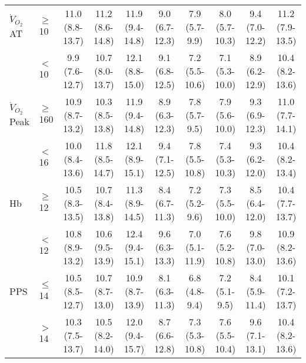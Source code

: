 \begin{sidewaystable}[p]
\begin{tabular}{|l l | cc cc cc cc |}
		$\dot{V}_{O_2}$AT   & $\geq$10  & 11.0 (8.8-13.7) & 11.2 (8.6-14.8) & 11.9 (9.4-14.8)  & 9.0 (6.7-12.3)  & 7.9 (5.7-9.9)  & 8.0 (5.7-10.3) & 9.4 (7.0-12.2)  & 11.2 (7.9-13.5) \\
		                    & $<$10     & 9.9 (7.6-12.7)  & 10.7 (8.0-13.7) & 12.1 (8.8-15.0)  & 9.1 (6.8-12.5)  & 7.2 (5.5-10.6) & 7.1 (5.3-10.0) & 8.9 (6.2-12.9)  & 10.4 (8.2-13.6) \\
		$\dot{V}_{O_2}$Peak & $\geq$160 & 10.9 (8.7-13.2) & 10.3 (8.5-13.8) & 11.9 (9.4-14.8)  & 8.9 (6.3-12.3)  & 7.8 (5.7-9.5)  & 7.9 (5.6-10.0) & 9.3 (6.9-12.3)  & 11.0 (7.7-14.1) \\
		                    & $<$16     & 10.0 (8.4-13.6) & 11.8 (8.5-14.7) & 12.1 (8.9-15.1)  & 9.4 (7.1-12.5)  & 7.8 (5.5-10.8) & 7.4 (5.3-10.3) & 9.3 (6.2-12.0)  & 10.4 (8.2-13.4) \\
		Hb                  & $\geq$12  & 10.5 (8.3-13.5) & 10.7 (8.4-13.8) & 11.3 (8.9-14.5)  & 8.4 (6.7-11.3)  & 7.2 (5.2-9.6)  & 7.3 (5.5-10.0) & 8.5 (6.4-12.0)  & 10.4 (7.7-13.7) \\
		                    & $<$12     & 10.8 (8.9-13.2) & 10.6 (9.5-13.9) & 12.4 (9.4-15.1)  & 9.6 (6.3-13.3)  & 7.0 (5.1-11.9) & 7.6 (5.2-10.8) & 9.8 (7.0-13.0)  & 10.9 (8.2-13.6) \\
		PPS                 & $\leq$14  & 10.5 (8.5-12.7) & 10.7 (8.7-13.0) & 10.9 (8.7-13.9)  & 8.1 (6.3-11.3)  & 6.8 (4.8-9.4)  & 7.2 (5.1-9.5)  & 8.4 (5.9-11.4)  & 10.1 (7.2-13.7) \\
		                    & $>$14     & 10.3 (7.5-13.7) & 10.5 (8.2-14.0) & 12.0 (9.4-15.7)  & 8.7 (6.6-12.8)  & 7.3 (5.3-10.8) & 7.6 (5.5-10.4) & 9.6 (7.1-13.1)  & 10.4 (8.2-13.6) \\ \hline
	\end{tabular}	
\end{sidewaystable}

























